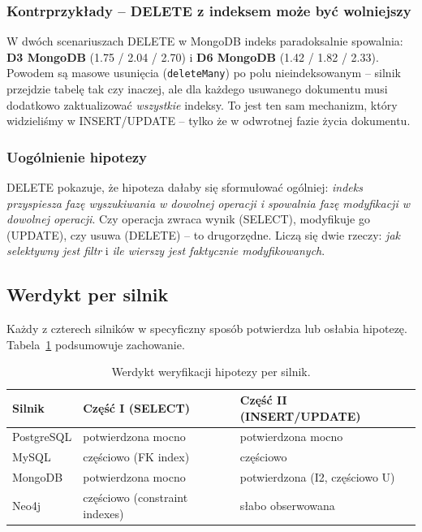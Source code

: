 \subsubsection*{Kontrprzykłady -- DELETE z indeksem może być wolniejszy}

W dwóch scenariuszach DELETE w MongoDB indeks paradoksalnie spowalnia:
\textbf{D3 MongoDB} (1.75 / 2.04 / 2.70) i \textbf{D6 MongoDB}
(1.42 / 1.82 / 2.33). Powodem są masowe usunięcia (\texttt{deleteMany})
po polu nieindeksowanym -- silnik przejdzie tabelę tak czy inaczej,
ale dla każdego usuwanego dokumentu musi dodatkowo zaktualizować
\emph{wszystkie} indeksy. To jest ten sam mechanizm, który widzieliśmy
w INSERT/UPDATE -- tylko że w odwrotnej fazie życia dokumentu.

\subsubsection*{Uogólnienie hipotezy}

DELETE pokazuje, że hipoteza dałaby się sformułować ogólniej:
\emph{indeks przyspiesza fazę wyszukiwania w dowolnej operacji
i spowalnia fazę modyfikacji w dowolnej operacji}. Czy operacja
zwraca wynik (SELECT), modyfikuje go (UPDATE), czy usuwa (DELETE) --
to drugorzędne. Liczą się dwie rzeczy: \emph{jak selektywny jest filtr}
i \emph{ile wierszy jest faktycznie modyfikowanych}.

\subsection{Werdykt per silnik}

Każdy z czterech silników w specyficzny sposób potwierdza lub
osłabia hipotezę. Tabela~\ref{tab:hypothesis_verdict} podsumowuje
zachowanie.

\begin{table}[H]
    \centering
    \small
    \begin{tabular}{lll}
        \toprule
        \textbf{Silnik} & \textbf{Część I (SELECT)} & \textbf{Część II (INSERT/UPDATE)} \\
        \midrule
        PostgreSQL & potwierdzona mocno    & potwierdzona mocno \\
        MySQL      & częściowo (FK index)  & częściowo \\
        MongoDB    & potwierdzona mocno    & potwierdzona (I2, częściowo U) \\
        Neo4j      & częściowo (constraint indexes) & słabo obserwowana \\
        \bottomrule
    \end{tabular}
    \caption{Werdykt weryfikacji hipotezy per silnik.}
    \label{tab:hypothesis_verdict}
\end{table}

